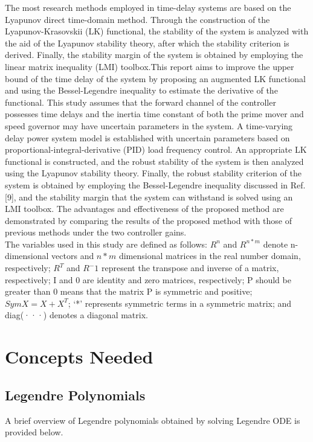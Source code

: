 \documentclass[journal]{IEEEtran}
\begin{document}
The most research methods employed in time-delay systems are based on the Lyapunov direct time-domain method. Through the construction of the Lyapunov-Krasovskii (LK) functional, the stability of the system is analyzed with the aid of the Lyapunov stability theory, after which the stability criterion is derived. Finally, the stability margin of the system is obtained by employing the linear matrix inequality (LMI) toolbox.This report aims to improve the upper bound of the time delay of the system by proposing an augmented LK functional and using the Bessel-Legendre inequality to estimate the derivative of the functional. This study assumes that the forward channel of the controller possesses time delays and the inertia time constant of both the prime mover and speed governor may have uncertain parameters in the system. A time-varying delay power system model is established with uncertain parameters based on proportional-integral-derivative (PID) load frequency control. An appropriate LK functional is constructed, and the robust stability of the system is then analyzed using the Lyapunov stability theory. Finally, the robust stability criterion of the system is obtained by employing the Bessel-Legendre inequality discussed in Ref. [9], and the stability margin that the system can withstand is solved using an LMI toolbox. The advantages and effectiveness of the proposed method are demonstrated by comparing the results of the proposed method with those of previous methods under the two controller gains.\\

The variables used in this study are defined as follows:
 $R^n$ and $R^{n*m}$ denote n-dimensional vectors and $n * m$ dimensional matrices in the real number domain, respectively; $R^T$ and $R^-1$ represent the transpose and inverse of a matrix, respectively; I and 0 are identity and zero matrices, respectively;  P  should be greater than 0 means that the matrix P is symmetric and positive; $Sym{X}=X+X^T$; ‘*’ represents symmetric terms in a symmetric matrix; and diag(···) denotes a diagonal matrix. \\


\section{Concepts Needed}

\subsection{Legendre Polynomials}
A brief overview of Legendre polynomials obtained by solving Legendre
ODE is provided below. \\ 
\end{document}
